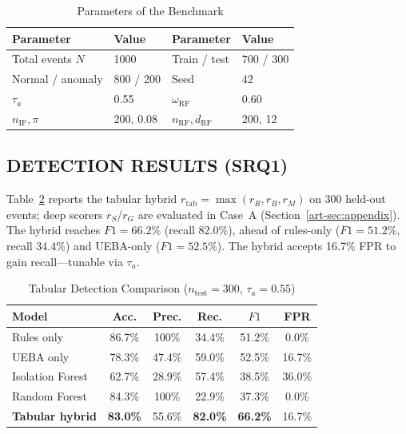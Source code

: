 \begin{table}[H]
\caption{Parameters of the Benchmark}
\label{art-tab:exp-params}
\centering
\scriptsize
\begin{tabular}{@{}ll|ll@{}}
\toprule
\textbf{Parameter} & \textbf{Value} & \textbf{Parameter} & \textbf{Value} \\
\midrule
Total events $N$ & 1000 & Train / test & 700 / 300 \\
Normal / anomaly & 800 / 200 & Seed & 42 \\
$\tau_a$ & 0.55 & $\omega_{\mathrm{RF}}$ & 0.60 \\
$n_{\mathrm{IF}},\pi$ & 200, 0.08 & $n_{\mathrm{RF}},d_{\mathrm{RF}}$ & 200, 12 \\
\bottomrule
\end{tabular}
\end{table}

\subsection{DETECTION RESULTS (SRQ1)}
Table~\ref{art-tab:detection} reports the tabular hybrid $r_{\mathrm{tab}}=\max(r_R,r_B,r_M)$ on 300 held-out events; deep scorers $r_S$/$r_G$ are evaluated in Case~A (Section~\ref{art-sec:appendix}). The hybrid reaches $F1=66.2\%$ (recall 82.0\%), ahead of rules-only ($F1=51.2\%$, recall 34.4\%) and UEBA-only ($F1=52.5\%$). The hybrid accepts 16.7\% FPR to gain recall---tunable via $\tau_a$.

\begin{table}[H]
\caption{Tabular Detection Comparison ($n_{\mathrm{test}}=300$, $\tau_a=0.55$)}
\label{art-tab:detection}
\centering
\scriptsize
\begin{tabular}{@{}lccccc@{}}
\toprule
\textbf{Model} & Acc. & Prec. & Rec. & $F1$ & FPR \\
\midrule
Rules only & 86.7\% & 100\% & 34.4\% & 51.2\% & 0.0\% \\
UEBA only & 78.3\% & 47.4\% & 59.0\% & 52.5\% & 16.7\% \\
Isolation Forest & 62.7\% & 28.9\% & 57.4\% & 38.5\% & 36.0\% \\
Random Forest & 84.3\% & 100\% & 22.9\% & 37.3\% & 0.0\% \\
\textbf{Tabular hybrid} & \textbf{83.0\%} & 55.6\% & \textbf{82.0\%} & \textbf{66.2\%} & 16.7\% \\
\bottomrule
\end{tabular}
\end{table}

